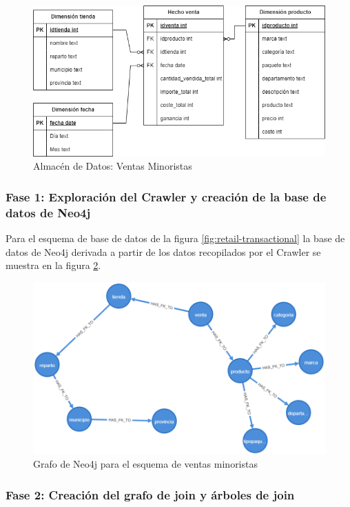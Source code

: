 \begin{figure}
    \centering
    \includegraphics[scale=0.5]{Graphics/retailSales-Data Warehouse.drawio.png}
    \caption{Almacén de Datos: Ventas Minoristas}
    \label{fig:retail-Warehouse}
\end{figure}

\subsubsection{Fase 1: Exploraci\'on del Crawler y creaci\'on de la base de datos de Neo4j}

Para el esquema de base de datos de la figura \ref{fig:retail-transactional} la base de datos de Neo4j derivada a 
partir de los datos recopilados por el Crawler se muestra en la figura \ref{fig:catalogexp1}.

\begin{figure}
  \centering
  \includegraphics[scale=0.4]{Graphics/graph (1).png}
  \caption{Grafo de Neo4j para el esquema de ventas minoristas}
  \label{fig:catalogexp1}
\end{figure}

\subsubsection{Fase 2: Creaci\'on del grafo de join y \'arboles de join}

